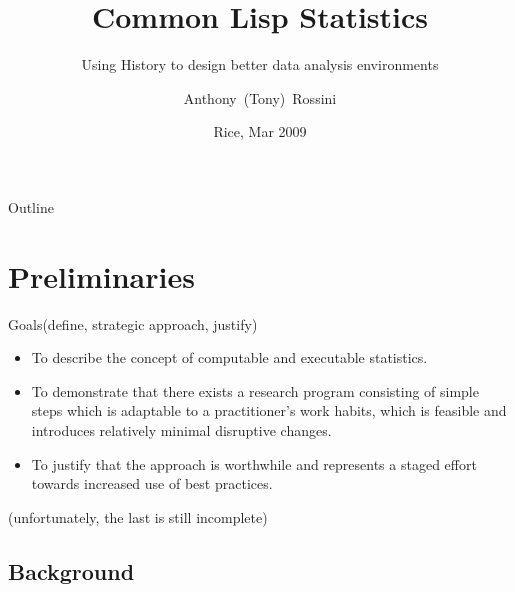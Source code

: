 \documentclass{beamer}
\title[CLS]{Common Lisp Statistics}
\subtitle{Using History to design better data analysis environments}
\author[Rossini]{Anthony~(Tony)~Rossini}
\institute[Novartis and University of Washington] %
{
  Group Head, Modeling and Simulation\\
  Novartis Pharma AG, Switzerland
  \and
  Affiliate Assoc Prof, Biomedical and Health Informatics\\
  University of Washington, USA}
\date[Rice 09]{Rice, Mar 2009}
\begin{document}
\begin{frame}
  \titlepage
\end{frame}

\begin{frame}{Outline}
  \tableofcontents
\end{frame}




\section{Preliminaries}

\begin{frame}{Goals}{(define, strategic approach, justify)}

  \begin{itemize}
  \item To describe the concept of \alert{computable and executable
      statistics}.

  \item To demonstrate that \alert{there exists a research program}
    consisting of simple steps which is adaptable to a practitioner's
    work habits, which is feasible and introduces relatively minimal
    disruptive changes.

  \item To justify that the \alert{approach is worthwhile} and
    represents a staged effort towards \alert{increased use of best
      practices}.
  \end{itemize}
  (unfortunately, the last is still incomplete)
\end{frame}

\subsection{Background}
\end{document}
